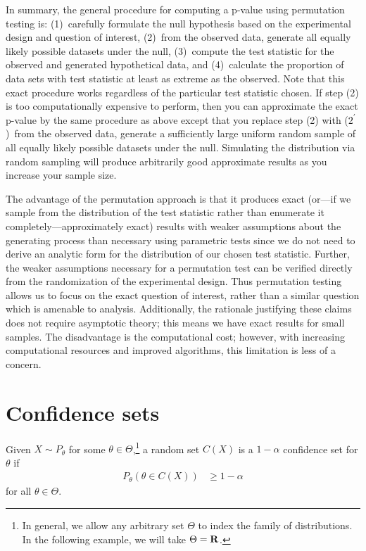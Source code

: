 In summary, the general procedure for computing a p-value using permutation
testing is: (1)~carefully formulate the null hypothesis based on the
experimental design and question of interest, (2)~from the observed data,
generate all equally likely possible datasets under the null, (3)~compute the
test statistic for the observed and generated hypothetical data, and 
(4)~calculate the proportion of data sets with test statistic at least as extreme
as the observed.  Note that this exact procedure works regardless of the
particular test statistic chosen.  If step (2) is too computationally expensive
to perform, then you can approximate the exact p-value by the same procedure as
above except that you replace step (2) with ($2^\prime$)~from the observed
data, generate a sufficiently large uniform random sample of all equally likely
possible datasets under the null. Simulating the distribution via random
sampling will produce arbitrarily good approximate results as you increase your
sample size.

The advantage of the permutation approach is that it produces exact (or---if we
sample from the distribution of the test statistic rather than enumerate it
completely---approximately exact) results with weaker assumptions 
about the generating process than necessary using parametric tests since we do
not need to derive an analytic form for the distribution of our chosen test statistic.
Further, the weaker assumptions necessary for a permutation test can be
verified directly from the randomization of the experimental design.  Thus
permutation testing allows us to focus on the exact question of interest,
rather than a similar question which is amenable to analysis.  Additionally,
the rationale justifying these claims does not require asymptotic theory; this
means we have exact results for small samples.  The disadvantage is the
computational cost; however, with increasing computational resources and
improved algorithms, this limitation is less of a concern.

\section{Confidence sets}

Given $X \sim P_\theta$ for some $\theta \in \Theta$,\footnote{In general, we allow any
arbitrary set $\Theta$ to index the family of distributions. In the following example, we will take $\Theta =\mathbf{R}$.} a random set
$C(X)$ is a $1 - \alpha$ confidence set for $\theta$ if
\begin{align*}
P_\theta(\theta \in C(X)) &\ge 1 - \alpha
\end{align*}
for all $\theta \in \Theta$.

